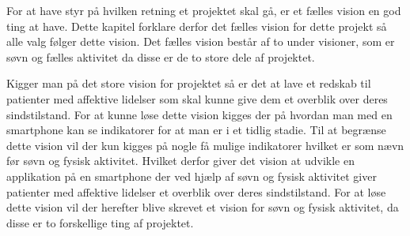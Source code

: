 For at have styr på hvilken retning et projektet skal gå, er et fælles vision en god ting at have.
Dette kapitel forklare derfor det fælles vision for dette projekt så alle valg følger dette vision.
Det fælles vision består af to under visioner, som er søvn og fælles aktivitet da disse er de to store dele af projektet.

Kigger man på det store vision for projektet så er det at lave et redskab til patienter med affektive lidelser som skal kunne give dem et overblik over deres sindstilstand.
For at kunne løse dette vision kigges der på hvordan man med en smartphone kan se indikatorer for at man er i et tidlig stadie.
Til at begrænse dette vision vil der kun kigges på nogle få mulige indikatorer hvilket er som nævn før søvn og fysisk aktivitet.
Hvilket derfor giver det vision at udvikle en applikation på en smartphone der ved hjælp af søvn og fysisk aktivitet giver patienter med affektive lidelser et overblik over deres sindstilstand.
For at løse dette vision vil der herefter blive skrevet et vision for søvn og fysisk aktivitet, da disse er to forskellige ting af projektet.